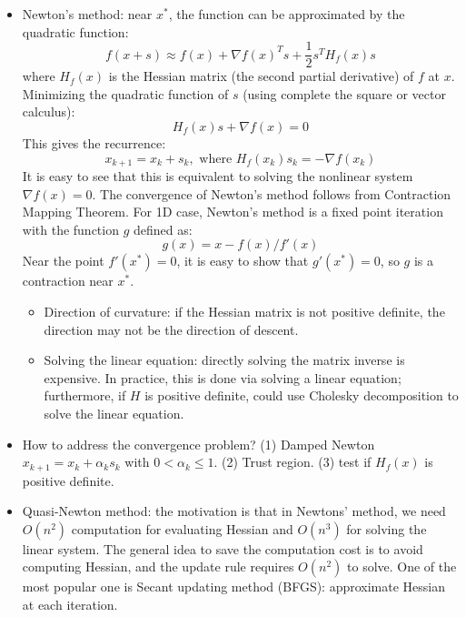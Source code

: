 \documentclass{report}
\begin{document}
\begin{itemize}
\item Newton's method: near $x^*$, the function can be approximated by the quadratic function: 
\begin{equation}
f(x + s) \approx f(x) + \nabla f(x)^T s + \frac{1}{2} s^T H_f(x) s
\end{equation}
where $H_f(x)$ is the Hessian matrix (the second partial derivative) of $f$ at $x$. Minimizing the quadratic function of $s$ (using complete the square or vector calculus): 
\begin{equation}
H_f(x) s + \nabla f(x) = 0
\end{equation}
This gives the recurrence: 
\begin{equation}
x_{k+1} = x_k + s_k, \text{ where } H_f(x_k) s_k = -\nabla f(x_k) 	
\end{equation}
It is easy to see that this is equivalent to solving the nonlinear system $\nabla f(x) = 0$. The convergence of Newton's method follows from Contraction Mapping Theorem. For 1D case, Newton's method is a fixed point iteration with the function $g$ defined as: 
\begin{equation}
g(x) = x - f(x)/f'(x)	
\end{equation}
Near the point $f'(x^*) = 0$, it is easy to show that $g'(x^*) = 0$, so $g$ is a contraction near $x^*$.
\begin{itemize}
\item Direction of curvature: if the Hessian matrix is not positive definite, the direction may not be the direction of descent. 
\item Solving the linear equation: directly solving the matrix inverse is expensive. In practice, this is done via solving a linear equation; furthermore, if $H$ is positive definite, could use Cholesky decomposition to solve the linear equation. 
\end{itemize}
 
\item How to address the convergence problem? (1) Damped Newton $x_{k+1} = x_k + \alpha_k s_k$ with $0 < \alpha_k \leq 1$. (2) Trust region. (3) test if $H_f(x)$ is positive definite. 

\item Quasi-Newton method: the motivation is that in Newtons' method, we need $O(n^2)$ computation for evaluating Hessian and $O(n^3)$ for solving the linear system. The general idea to save the computation cost is to avoid computing Hessian, and the update rule requires $O(n^2)$ to solve. One of the most popular one is Secant updating method (BFGS): approximate Hessian at each iteration. 
\end{itemize}
\end{document}
